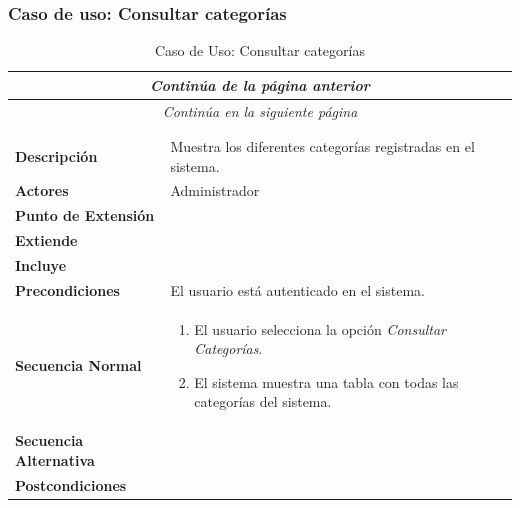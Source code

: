 


\newpage
\subsubsection*{Caso de uso: Consultar categorías }
\begin{longtable}{| p{4cm} | p{10cm} |}
\endfirsthead
\multicolumn{2}{c}{\textit{Continúa de la página anterior}}\\[12pt]
\hline
\endhead
\hline
\multicolumn{2}{c}{\textit{Continúa en la siguiente página}} \\
\endfoot
\hline
\caption{Caso de Uso: Consultar categorías}\label{fig:1}\\
\endlastfoot


\hline
\multicolumn{2}{|c|}{\textbf{CU$<$42$>$ - Consultar Categorías}} \\

\hline
\textbf{Descripción} &
Muestra los diferentes categorías registradas en el sistema.\\

\hline
\textbf{Actores} &
Administrador\\


\hline
\textbf{Punto de Extensión} &
\\

\hline
\textbf{Extiende} &
\\

\hline
\textbf{Incluye} &
\\

\hline
\textbf{Precondiciones} &
El usuario está autenticado en el sistema.\\

\hline
\textbf{Secuencia Normal} &\mbox{}\par\vspace{-\baselineskip}
\begin{enumerate}[leftmargin=0.7cm, topsep=0.1cm]
\item El usuario selecciona la opción \textit{Consultar Categorías}.
\item El sistema muestra una tabla con todas las categorías del sistema.
\end{enumerate}


\\
\hline
\textbf{Secuencia Alternativa} &\mbox{}\par\vspace{-\baselineskip}
\\

\hline
\textbf{Postcondiciones} & \\
\hline
\end{longtable}



